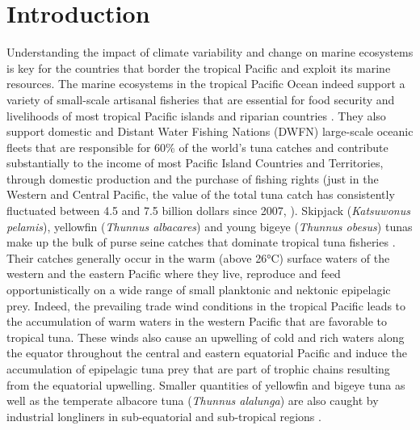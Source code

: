 
\section{Introduction}

Understanding the impact of climate variability and change on marine ecosystems is key for the countries that border the tropical Pacific and exploit its marine resources. The marine ecosystems in the tropical Pacific Ocean indeed support a variety of small-scale artisanal fisheries that are essential for food security and livelihoods of most tropical Pacific islands and riparian countries \citep{batistaTropicalArtisanalCoastal2014}. They also support domestic and Distant Water Fishing Nations (DWFN) large-scale oceanic fleets that are responsible for 60\% of the world's tuna catches and  contribute substantially to the income of most Pacific Island Countries and Territories, through domestic production and the purchase of fishing rights (just in the Western and Central Pacific, the value of the total tuna catch has consistently fluctuated between 4.5 and 7.5 billion dollars since 2007, \citealt{williamsOverviewTunaFisheries2021}). Skipjack (\textit{Katsuwonus pelamis}), yellowfin (\textit{Thunnus albacares}) and young bigeye (\textit{Thunnus obesus}) tunas make up the bulk of purse seine catches that dominate tropical tuna fisheries \citep{allainOverviewTunaFisheries2018}. Their catches generally occur in the warm (above 26°C) surface waters of the western and the eastern Pacific where they live, reproduce and feed opportunistically on a wide range of small planktonic and nektonic epipelagic prey. Indeed, the prevailing trade wind conditions in the tropical Pacific leads to the accumulation of warm waters in the western Pacific that are favorable to tropical tuna. These winds also cause an upwelling of cold and rich waters along the equator throughout the central and eastern equatorial Pacific and induce the accumulation of epipelagic tuna prey that are part of trophic chains resulting from the equatorial upwelling. Smaller quantities of yellowfin and bigeye tuna as well as the temperate albacore tuna (\textit{Thunnus alalunga}) are also caught by industrial longliners in sub-equatorial and sub-tropical regions \citep{allainOverviewTunaFisheries2018}.

